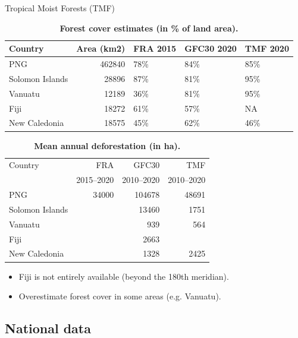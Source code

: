 \documentclass[10pt,table,dvipsnames,compress]{beamer}
\begin{document}
\begin{frame}[label={sec:org7f1694d}]{Tropical Moist Forests (TMF)}
\begin{table}[htbp]
\caption{\textbf{Forest cover estimates (in \% of land area).}}
\centering
\footnotesize
\begin{tabular}{lrlll}
Country & Area (km2) & FRA 2015 & GFC30 2020 & TMF 2020\\[0pt]
\hline
PNG & 462840 & 78\% & 84\% & 85\%\\[0pt]
Solomon Islands & 28896 & 87\% & 81\% & 95\%\\[0pt]
Vanuatu & 12189 & 36\% & 81\% & 95\%\\[0pt]
Fiji & 18272 & 61\% & 57\% & NA\\[0pt]
New Caledonia & 18575 & 45\% & 62\% & 46\%\\[0pt]
\end{tabular}
\end{table}

\begin{table}[htbp]
\caption{\textbf{Mean annual deforestation (in ha).}}
\centering
\footnotesize
\begin{tabular}{lrrr}
Country & FRA & GFC30 & TMF\\[0pt]
 & 2015--2020 & 2010--2020 & 2010--2020\\[0pt]
\hline
PNG & 34000 & 104678 & 48691\\[0pt]
Solomon Islands &  & 13460 & 1751\\[0pt]
Vanuatu &  & 939 & 564\\[0pt]
Fiji &  & 2663 & \\[0pt]
New Caledonia &  & 1328 & 2425\\[0pt]
\end{tabular}
\end{table}

\begin{itemize}
\item Fiji is not entirely available (beyond the 180th meridian).
\item Overestimate forest cover in some areas (e.g. Vanuatu).
\end{itemize}
\end{frame}

\subsection{National data}
\label{sec:orgb50da5c}
\end{document}
